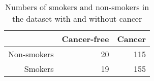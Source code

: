 \begin{table}[ht]
\centering
\begin{tabular}{rrr}
  \hline
 & Cancer-free & Cancer \\ 
  \hline
Non-smokers & 20 & 115 \\ 
  Smokers & 19 & 155 \\ 
   \hline
\end{tabular}
\caption{Numbers of smokers and non-smokers in the dataset with and without cancer} 
\end{table}
